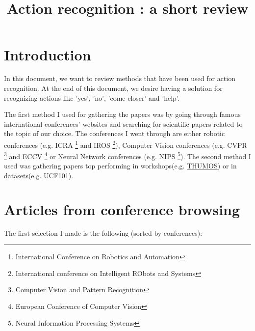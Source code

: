 \documentclass[a4paper]{article}
\begin{document}
	\title{Action recognition : a short review}


	\section{Introduction}
		In this document, we want to review methods that have been used for action recognition. At the end of this document, we desire having a solution for recognizing actions like 'yes', 'no', 'come closer' and 'help'. 

		The first method I used for gathering the papers was by going through famous international conferences' websites and searching for scientific papers related to the topic of our choice. The conferences I went through are either robotic conferences (e.g. ICRA \footnote{International Conference on Robotics and Automation} and IROS \footnote{International conference on Intelligent RObots and Systems}), Computer Vision conferences (e.g. CVPR \footnote{Computer Vision and Pattern Recognition} and ECCV \footnote{European Conference of Computer Vision} or Neural Network conferences (e.g. NIPS \footnote{Neural Information Processing Systems}).
		The second method I used was gathering papers top performing in workshops(e.g. \href{http://crcv.ucf.edu/data/UCF101.php}{THUMOS}) or in datasets(e.g. \href{http://crcv.ucf.edu/THUMOS14/results.html}{UCF101}).

	\section{Articles from conference browsing}
		The first selection I made is the following (sorted by conferences):
\end{document}
